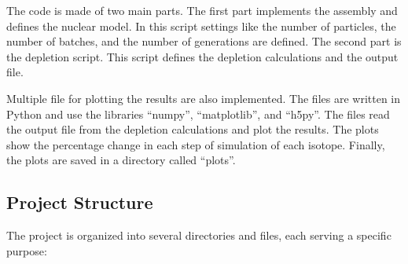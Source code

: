 The code is made of two main parts. The first part implements the assembly and defines the nuclear model. In this script settings like the number of particles, the number of batches, and the number of generations are defined. The second part is the depletion script. This script defines the depletion calculations and the output file.

Multiple file for plotting the results are also implemented. The files are written in Python and use the libraries ``numpy'', ``matplotlib'', and ``h5py''. The files read the output file from the depletion calculations and plot the results. The plots show the percentage change in each step of simulation of each isotope. Finally, the plots are saved in a directory called ``plots''. 

\subsection{Project Structure}

The project is organized into several directories and files, each serving a specific purpose:

